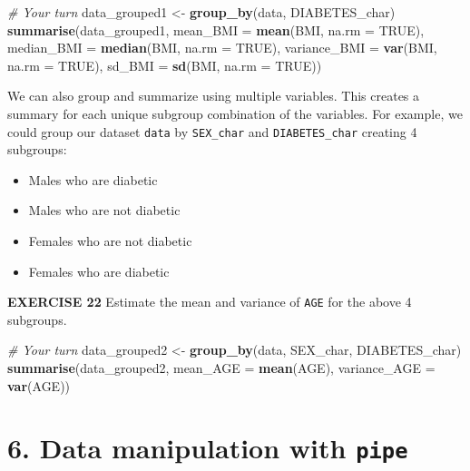 \documentclass[
]{article}
\newenvironment{Shaded}{\begin{snugshade}}{\end{snugshade}}
\newcommand{\CommentTok}[1]{\textcolor[rgb]{0.56,0.35,0.01}{\textit{#1}}}
\newcommand{\DataTypeTok}[1]{\textcolor[rgb]{0.13,0.29,0.53}{#1}}
\newcommand{\KeywordTok}[1]{\textcolor[rgb]{0.13,0.29,0.53}{\textbf{#1}}}
\newcommand{\NormalTok}[1]{#1}
\newcommand{\OtherTok}[1]{\textcolor[rgb]{0.56,0.35,0.01}{#1}}
\newcommand{\StringTok}[1]{\textcolor[rgb]{0.31,0.60,0.02}{#1}}
\providecommand{\tightlist}{%
  \setlength{\itemsep}{0pt}\setlength{\parskip}{0pt}}
\begin{document}
\begin{Shaded}
\begin{Highlighting}[]
\CommentTok{# Your turn}
\NormalTok{data_grouped1 <-}\StringTok{ }\KeywordTok{group_by}\NormalTok{(data, DIABETES_char)}
\KeywordTok{summarise}\NormalTok{(data_grouped1, }
          \DataTypeTok{mean_BMI =} \KeywordTok{mean}\NormalTok{(BMI, }\DataTypeTok{na.rm =} \OtherTok{TRUE}\NormalTok{), }
          \DataTypeTok{median_BMI =} \KeywordTok{median}\NormalTok{(BMI, }\DataTypeTok{na.rm =} \OtherTok{TRUE}\NormalTok{), }
          \DataTypeTok{variance_BMI =} \KeywordTok{var}\NormalTok{(BMI, }\DataTypeTok{na.rm =} \OtherTok{TRUE}\NormalTok{), }
          \DataTypeTok{sd_BMI =} \KeywordTok{sd}\NormalTok{(BMI, }\DataTypeTok{na.rm =} \OtherTok{TRUE}\NormalTok{))}
\end{Highlighting}
\end{Shaded}

We can also group and summarize using multiple variables. This creates a
summary for each unique subgroup combination of the variables. For
example, we could group our dataset \texttt{data} by \texttt{SEX\_char}
and \texttt{DIABETES\_char} creating 4 subgroups:

\begin{itemize}
\tightlist
\item
  Males who are diabetic
\item
  Males who are not diabetic
\item
  Females who are not diabetic
\item
  Females who are diabetic
\end{itemize}

\textbf{EXERCISE 22} Estimate the mean and variance of \texttt{AGE} for
the above 4 subgroups.

\begin{Shaded}
\begin{Highlighting}[]
\CommentTok{# Your turn}
\NormalTok{data_grouped2 <-}\StringTok{ }\KeywordTok{group_by}\NormalTok{(data, SEX_char, DIABETES_char)}
\KeywordTok{summarise}\NormalTok{(data_grouped2, }\DataTypeTok{mean_AGE =} \KeywordTok{mean}\NormalTok{(AGE), }
          \DataTypeTok{variance_AGE =} \KeywordTok{var}\NormalTok{(AGE))}
\end{Highlighting}
\end{Shaded}

\hypertarget{data-manipulation-with-pipe}{%
\section{\texorpdfstring{6. Data manipulation with
\texttt{pipe}}{6. Data manipulation with pipe}}\label{data-manipulation-with-pipe}}
\end{document}
